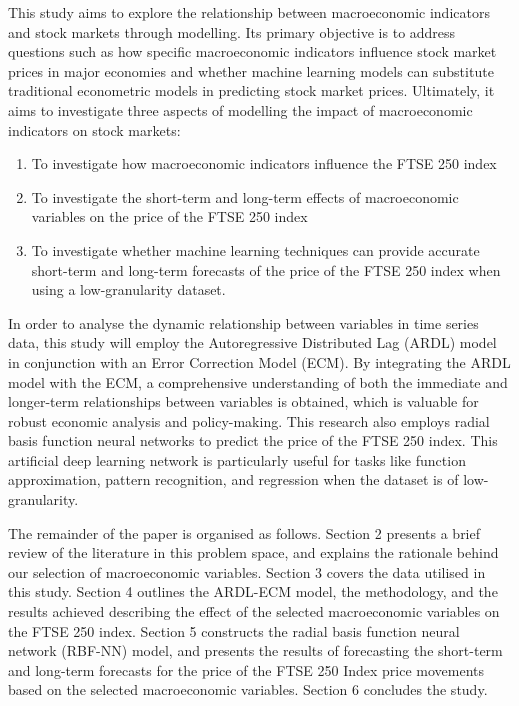 \documentclass[11pt,a4paper]{article}
\begin{document}
This study aims to explore the relationship between macroeconomic indicators and stock markets 
through modelling. Its primary objective is to address questions such as how specific 
macroeconomic indicators influence stock market prices in major economies and whether machine 
learning models can substitute traditional econometric models in predicting stock market prices. 
Ultimately, it aims to investigate three aspects of modelling the impact of macroeconomic 
indicators on stock markets: 
\begin{enumerate}
    \item To investigate how macroeconomic indicators influence the FTSE 250 index
    \item To investigate the short-term and long-term effects of macroeconomic variables on the price of the FTSE 250 index
    \item To investigate whether machine learning techniques can provide accurate short-term and long-term forecasts of the price of the FTSE 250 index when using a low-granularity dataset.
   
\end{enumerate}

In order to analyse the dynamic relationship between variables in time series data, this study will employ the Autoregressive Distributed Lag (ARDL) model in conjunction with an Error Correction Model (ECM). By integrating the ARDL model with the ECM, a comprehensive understanding of both the immediate and longer-term relationships between variables is obtained, which is valuable for robust economic analysis and policy-making.
This research also employs radial basis function neural networks to predict the price of the FTSE 250 index. This artificial deep learning network is particularly useful for tasks like function approximation, pattern recognition, and regression when the dataset is of low-granularity.

The remainder of the paper is organised as follows. Section 2 presents a brief review of the literature in this problem space, and explains the rationale behind our selection of macroeconomic variables. Section 3 covers the data utilised in this study. Section 4 outlines the ARDL-ECM model, the methodology, and the results achieved describing the effect of the selected macroeconomic variables on the FTSE 250 index. Section 5 constructs the radial basis function neural network (RBF-NN) model, and presents the results of forecasting the short-term and long-term forecasts for the price of the FTSE 250 Index price movements based on the selected macroeconomic variables. Section 6 concludes the study.
\end{document}
